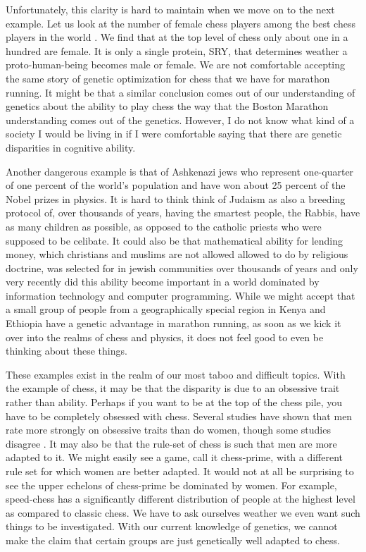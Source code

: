 Unfortunately, this clarity is hard to maintain when we move on to the next example.
Let us look at the number of female chess players among the best chess players in the world \cite{chess2020}.
We find that at the top level of chess only about one in a hundred are female.
It is only a single protein, SRY, that determines weather a proto-human-being becomes male or female.
We are not comfortable accepting the same story of genetic optimization for chess that we have for marathon running.
It might be that a similar conclusion comes out of our understanding of genetics about the ability to play chess the way that the Boston Marathon understanding comes out of the genetics.
However, I do not know what kind of a society I would be living in if I were comfortable saying that there are genetic disparities in cognitive ability.

Another dangerous example is that of Ashkenazi jews who represent one-quarter of one percent of the world's population and have won about 25 percent of the Nobel prizes in physics.
It is hard to think think of Judaism as also a breeding protocol of, over thousands of years, having the smartest people, the Rabbis, have as many children as possible, as opposed to the catholic priests who were supposed to be celibate.
It could also be that mathematical ability for lending money, which christians and muslims are not allowed allowed to do by religious doctrine, was selected for in jewish communities over thousands of years and only very recently did this ability become important in a world dominated by information technology and computer programming.
While we might accept that a small group of people from a geographically special region in Kenya and Ethiopia have a genetic advantage in marathon running, as soon as we kick it over into the realms of chess and physics, it does not feel good to even be thinking about these things.

These examples exist in the realm of our most taboo and difficult topics.
With the example of chess, it may be that the disparity is due to an obsessive trait rather than ability.
Perhaps if you want to be at the top of the chess pile, you have to be completely obsessed with chess.
Several studies have shown that men rate more strongly on obsessive traits than do women, though some studies disagree \cite{Mathis2011}.
It may also be that the rule-set of chess is such that men are more adapted to it.
We might easily see a game, call it chess-prime, with a different rule set for which women are better adapted.
It would not at all be surprising to see the upper echelons of chess-prime be dominated by women.
For example, speed-chess has a significantly different distribution of people at the highest level as compared to classic chess.
We have to ask ourselves weather we even want such things to be investigated.
With our current knowledge of genetics, we cannot make the claim that certain groups are just genetically well adapted to chess.

